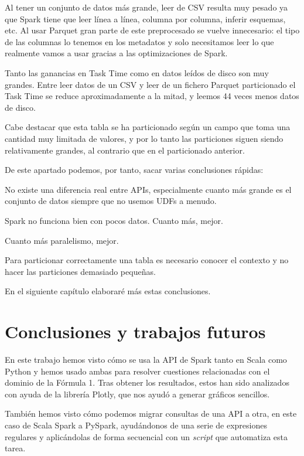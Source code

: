 \documentclass[12pt,twoside,titlepage]{report}
\begin{document}
Al tener un conjunto de datos más grande, leer de CSV resulta muy pesado ya que Spark tiene que leer línea a línea, columna por columna, inferir esquemas, etc. Al usar Parquet gran parte de este preprocesado se vuelve innecesario: el tipo de las columnas lo tenemos en los metadatos y solo necesitamos leer lo que realmente vamos a usar gracias a las optimizaciones de Spark. 

Tanto las ganancias en Task Time como en datos leídos de disco son muy grandes. Entre leer datos de un CSV y leer de un fichero Parquet particionado el Task Time se reduce aproximadamente a la mitad, y leemos 44 veces menos datos de disco.

Cabe destacar que esta tabla se ha particionado según un campo que toma una cantidad muy limitada de valores, y por lo tanto las particiones siguen siendo relativamente grandes, al contrario que en el particionado anterior.

De este apartado podemos, por tanto, sacar varias conclusiones rápidas: 

\begin{compactitem}
	\item No existe una diferencia real entre APIs, especialmente cuanto más grande es el conjunto de datos siempre que no usemos UDFs a menudo.
	\item Spark no funciona bien con pocos datos. Cuanto más, mejor.
	\item Cuanto más paralelismo, mejor.
	\item Para particionar correctamente una tabla es necesario conocer el contexto y no hacer las particiones demasiado pequeñas.
\end{compactitem}

En el siguiente capítulo elaboraré más estas conclusiones.



\chapter{Conclusiones y trabajos futuros}
\newpage

En este trabajo hemos visto cómo se usa la API de Spark tanto en Scala como Python y hemos usado ambas para resolver cuestiones relacionadas con el dominio de la Fórmula 1. Tras obtener los resultados, estos han sido analizados con ayuda de la librería Plotly, que nos ayudó a generar gráficos sencillos.

También hemos visto cómo podemos migrar consultas de una API a otra, en este caso de Scala Spark a PySpark, ayudándonos de una serie de expresiones regulares y aplicándolas de forma secuencial con un \textit{script} que automatiza esta tarea.
\end{document}
